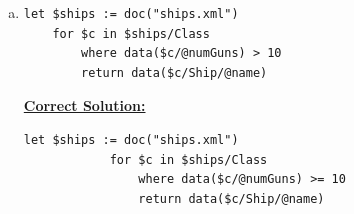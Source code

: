 \documentclass[12pt]{article}
\begin{document}
\begin{enumerate}[1.]
\begin{enumerate}[a)]
\begin{mdframed}
        \end{mdframed}

        \item

    \begin{lstlisting}[language=XML]
    let $ships := doc("ships.xml")
    for $c in $ships/Class
        where data($c/@numGuns) > 10
        return data($c/Ship/@name)
    \end{lstlisting}

        \begin{mdframed}
            \underline{\textbf{Correct Solution:}}

            \begin{lstlisting}[language=XML]
            let $ships := doc("ships.xml")
            for $c in $ships/Class
                where data($c/@numGuns) >= 10
                return data($c/Ship/@name)
            \end{lstlisting}

        \end{mdframed}
    \end{enumerate}
\end{enumerate}
\end{document}

